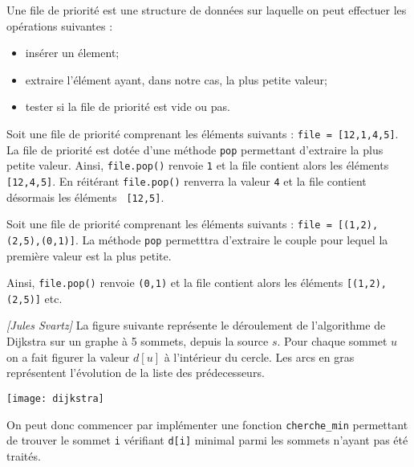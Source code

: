 \begin{defi}
Une file de priorité est une structure de données sur laquelle on peut effectuer les opérations suivantes : 
\begin{itemize}
\item insérer un élement;
\item extraire l'élément ayant, dans notre cas, la plus petite valeur;
\item tester si la file de priorité est vide ou pas.
\end{itemize}

\end{defi}

\begin{exemple}
Soit une file de priorité comprenant les éléments suivants : \texttt{file = [12,1,4,5]}. La file de priorité est dotée d'une méthode \texttt{pop} permettant d'extraire la plus petite valeur. 
Ainsi, \texttt{file.pop()} renvoie \texttt{1} et la file contient alors les éléments \texttt{ [12,4,5]}. 
En réitérant \texttt{file.pop()} renverra la valeur \texttt{4} et la file contient désormais  les éléments \texttt{ [12,5]}.


Soit une file de priorité comprenant les éléments suivants : \texttt{file = [(1,2),(2,5),(0,1)]}. La méthode \texttt{pop} permetttra d'extraire le couple pour lequel la première valeur est la plus petite. 

Ainsi, \texttt{file.pop()} renvoie \texttt{(0,1)} et la file contient alors les éléments \texttt{[(1,2),(2,5)]} etc.

\end{exemple}


\begin{exemple} \textit{[Jules Svartz]} 
La figure suivante représente le déroulement de l’algorithme de Dijkstra sur un graphe à 5 sommets, depuis 
la source $s$. Pour chaque sommet $u$ on a fait figurer la valeur $d[u]$ à l’intérieur du cercle. Les arcs en gras représentent
l’évolution de la liste des prédecesseurs.
\end{exemple}

\begin{center}
\texttt{[image: dijkstra]}
\end{center}

On peut donc commencer par implémenter une fonction \texttt{cherche\_min} permettant de trouver le sommet \texttt{i} vérifiant \texttt{d[i]} minimal
parmi les sommets n'ayant pas été traités.%



